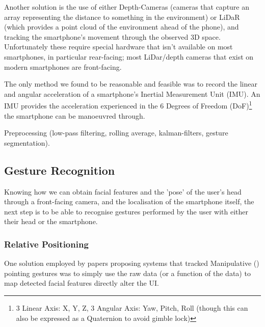 Another solution is the use of either Depth-Cameras (cameras that capture an array representing the distance to something in the environment) or LiDaR (which provides a point cloud of the environment ahead of the phone), and tracking the smartphone's movement through the observed 3D space.
Unfortunately these require special hardware that isn't available on most smartphones, in particular rear-facing; most LiDar/depth cameras that exist on modern smartphones are front-facing.

The only method we found to be reasonable and feasible was to record the linear and angular acceleration of a smartphone's Inertial Measurement Unit (IMU)\cite{mantyla2000hand, kratz2013combining, neelasagar2015real, garcia2014contextualized}. 
An IMU provides the acceleration experienced in the 6 Degrees of Freedom (DoF)\footnote{3 Linear Axis: X, Y, Z, 3 Angular Axis: Yaw, Pitch, Roll (though this can also be expressed as a Quaternion to avoid gimble lock)} the smartphone can be manoeuvred through.

Preprocessing (low-pass filtering, rolling average, kalman-filters, gesture segmentation).

\subsection{Gesture Recognition}
Knowing how we can obtain facial features and the 'pose' of the user's head through a front-facing camera, and the localisation of the smartphone itself, the next step is to be able to recognise gestures performed by the user with either their head or the smartphone.

\subsubsection{Relative Positioning}\nl
One solution employed by papers proposing systems that tracked Manipulative () pointing gestures was to simply use the raw data (or a function of the data) to map detected facial features directly alter the UI.

